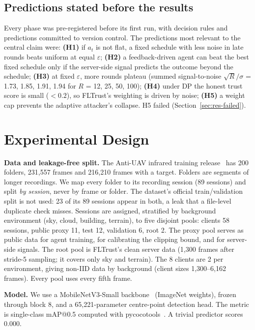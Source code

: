 \documentclass[journal]{IEEEtran}
\makeatletter
\newcommand{\eps}{\varepsilon}
\newcommand{\mAP}{mAP@0.5}
\makeatother
\begin{document}
\subsection{Predictions stated before the results}
Every phase was pre-registered before its first run, with decision rules and predictions committed to
version control. The predictions most relevant to the central claim were:
\textbf{(H1)} if $a_t$ is not flat, a fixed schedule with less noise in late rounds beats uniform
at equal $\eps$;
\textbf{(H2)} a feedback-driven agent can beat the best fixed schedule only if the server-side signal
predicts the outcome beyond the schedule;
\textbf{(H3)} at fixed $\eps$, more rounds plateau (summed signal-to-noise $\sqrt{R}/\sigma$ = 1.73,
1.85, 1.91, 1.94 for $R$ = 12, 25, 50, 100);
\textbf{(H4)} under DP the honest trust score is small ($<0.2$), so FLTrust's weighting is driven by
noise;
\textbf{(H5)} a weight cap prevents the adaptive attacker's collapse.
H5 failed (Section~\ref{sec:res-failed}).

\section{Experimental Design}
\label{sec:design}

\textbf{Data and leakage-free split.} The Anti-UAV infrared training release~\cite{zhao2023antiuav}
has 200 folders, 231,557 frames and 216,210 frames with a target. Folders are segments of
longer recordings. We map every folder to its recording session (89 sessions) and split \emph{by
session}, never by frame or folder. The dataset's official train/validation split is not used: 23 of
its 89 sessions appear in both, a leak that a file-level duplicate check misses. Sessions are
assigned, stratified by background environment (sky, cloud, building, terrain), to five disjoint
pools: clients 58 sessions, public proxy 11, test 12, validation 6, root 2. The proxy pool serves as
public data for agent training, for calibrating the clipping bound, and for server-side signals. The
root pool is FLTrust's clean server data (1,300 frames after stride-5 sampling; it covers only sky
and terrain). The 8 clients are 2 per environment, giving non-IID data by background (client sizes
1,300--6,162 frames). Every pool uses every fifth frame.

\textbf{Model.} We use a MobileNetV3-Small backbone~\cite{howard2019mobilenetv3} (ImageNet weights),
frozen through block 8, and a 65,221-parameter centre-point detection head. The metric is
single-class \mAP{} computed with pycocotools~\cite{lin2014coco}. A trivial predictor scores 0.000.
\end{document}
